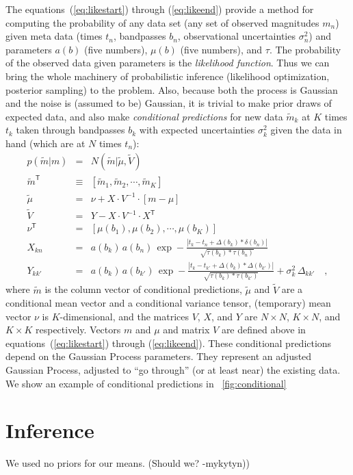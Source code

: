 \documentclass[letterpaper,12pt,preprint]{aastex}
\newcommand{\transpose}[1]{{#1}^{\mathsf{T}}}
\newcommand{\inverse}[1]{{#1}^{-1}}
\begin{document}
The equations~(\ref{eq:likestart}) through (\ref{eq:likeend})
provide a method for computing the probability of any data set (any
set of observed magnitudes $m_n$) given meta data (times $t_n$,
bandpasses $b_n$, observational uncertainties $\sigma_n^2$) and
parameters $a(b)$ (five numbers), $\mu(b)$ (five numbers), and $\tau$.
The probability of the observed data given parameters is the
\emph{likelihood function}.  Thus we can bring the whole machinery of
probabilistic inference (likelihood optimization, posterior sampling)
to the problem.  Also, because both the process is Gaussian and the
noise is (assumed to be) Gaussian, it is trivial to make prior draws
of expected data, and also make \emph{conditional predictions} for new
data $\tilde{m}_k$ at $K$ times $t_k$ taken through bandpasses $b_k$ with
expected uncertainties $\sigma_k^2$ given the data in hand (which are
at $N$ times $t_n$):
\begin{eqnarray}
p(\tilde{m}|m) &=& N(\tilde{m}|\tilde{\mu},\tilde{V})
\\
\transpose{\tilde{m}} &\equiv& [\tilde{m}_1, \tilde{m}_2, \cdots , \tilde{m}_K]
\\
\tilde{\mu} &=& \nu + X\cdot\inverse{V}\cdot [m - \mu]
\\
\tilde{V} &=& Y - X\cdot\inverse{V}\cdot\transpose{X}
\\
\transpose{\nu} &=& [\mu(b_1), \mu(b_2), \cdots , \mu(b_K)]
\\
X_{kn} &=& a(b_k)\,a(b_n)\,\exp -\frac{|t_k - t_n + \Delta(b_k) * \delta(b_n)|}{\sqrt{\tau(b_k)*\tau(b_n)}}
\\
Y_{kk'} &=& a(b_k)\,a(b_{k'})\,\exp -\frac{|t_k - t_{k'}+\Delta(b_k) * \Delta(b_{k'})|}{\sqrt{\tau(b_k)*\tau(b_{k'})}} + \sigma_k^2\,\Delta_{kk'}
\quad ,
\end{eqnarray}
where $\tilde{m}$ is the column vector of conditional predictions,
$\tilde{\mu}$ and $\tilde{V}$ are a conditional mean vector and a
conditional variance tensor, (temporary) mean vector $\nu$ is
$K$-dimensional, and the matrices $V$, $X$, and $Y$ are $N\times N$,
$K\times N$, and $K\times K$ respectively.  Vectors $m$ and $\mu$ and
matrix $V$ are defined above in equations~(\ref{eq:likestart}) through
(\ref{eq:likeend}).  These conditional predictions depend on the
Gaussian Process parameters.  They represent an adjusted Gaussian
Process, adjusted to ``go through'' (or at least near) the existing
data.  We show an example of conditional predictions in
\figurename~\ref{fig:conditional}

\section{Inference}
We used no priors for our means. (Should we? -mykytyn))
\end{document}
